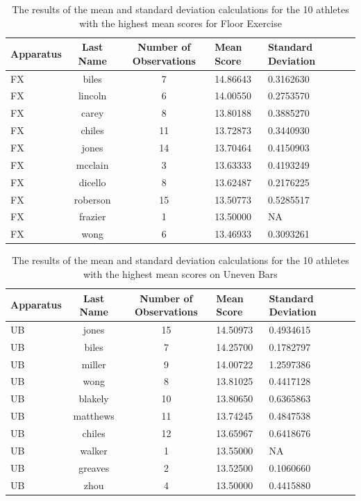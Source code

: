 \documentclass[12pt]{article}
\begin{document}
  \begin{table}[tbp]
    \caption{The results of the mean and standard deviation calculations for the 10 athletes with the highest 
    mean scores for Floor Exercise}
    \label{tab:tableFX}
\centering
\begin{tabular}[t]{lccllll}
   \toprule
  Apparatus & Last Name & Number of Observations & Mean Score & Standard Deviation\\
  \midrule
  FX & biles & 7 & 14.86643 & 0.3162630\\
  \midrule
  FX & lincoln & 6 & 14.00550 & 0.2753570\\
  \midrule
  FX & carey & 8 & 13.80188 & 0.3885270\\
  \midrule
  FX & chiles & 11 & 13.72873 & 0.3440930\\
  \midrule
  FX & jones & 14 & 13.70464 & 0.4150903\\
  \midrule
  FX & mcclain & 3 & 13.63333 & 0.4193249\\
  \midrule
  FX & dicello & 8 & 13.62487 & 0.2176225\\
  \midrule
  FX & roberson & 15 & 13.50773 & 0.5285517\\
  \midrule
  FX & frazier & 1 & 13.50000 & NA\\
  \midrule
  FX & wong & 6 & 13.46933 & 0.3093261\\
  \bottomrule
\bottomrule
  \end{tabular}
  \end{table} 

\begin{table}[tbp]
  \caption{The results of the mean and standard deviation calculations for the 10 athletes with the highest 
  mean scores on Uneven Bars}
  \label{tab:tableUB}
\centering
\begin{tabular}[t]{lccllll}
 \toprule
  Apparatus & Last Name & Number of Observations & Mean Score & Standard Deviation\\
  \midrule
  UB & jones & 15 & 14.50973 & 0.4934615\\
  \midrule
  UB & biles & 7 & 14.25700 & 0.1782797\\
  \midrule
  UB & miller & 9 & 14.00722 & 1.2597386\\
  \midrule
  UB & wong & 8 & 13.81025 & 0.4417128\\
  \midrule
  UB & blakely & 10 & 13.80650 & 0.6365863\\
  \midrule
  UB & matthews & 11 & 13.74245 & 0.4847538\\
  \midrule
  UB & chiles & 12 & 13.65967 & 0.6418676\\
  \midrule
  UB & walker & 1 & 13.55000 & NA\\
  \midrule
  UB & greaves & 2 & 13.52500 & 0.1060660\\
  \midrule
  UB & zhou & 4 & 13.50000 & 0.4415880\\
  \bottomrule
\bottomrule
  \end{tabular}
  \end{table}
\end{document}
